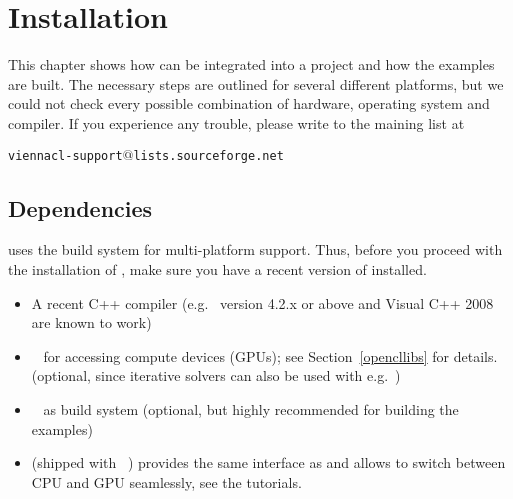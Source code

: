 \chapter{Installation}

This chapter shows how {\ViennaCL} can be integrated into a project and how the
examples are built. The necessary steps are outlined for several different
platforms, but we could not check every possible combination of hardware,
operating system and compiler. If you experience any trouble, please write to
the maining list at \\
\begin{center}
\texttt{viennacl-support$@$lists.sourceforge.net} 
\end{center}


\section{Dependencies}
\label{dependencies}
{\ViennaCL} uses the {\CMake} build system for multi-platform support.
Thus, before you proceed with the installation of {\ViennaCL}, make sure you
have a recent version of {\CMake} installed.

\begin{itemize}
 \item A recent C++ compiler (e.g.~{\GCC} version 4.2.x or above and Visual C++
2008 are known to work)
 \item {\OpenCL}~\cite{khronoscl,nvidiacl} for accessing compute devices (GPUs);
see Section~\ref{opencllibs} for details.
(optional, since iterative solvers can also be used with e.g.~{\ublas})
 \item {\CMake}~\cite{cmake} as build system (optional, but highly recommended
for building the examples)
 \item {\ublas} (shipped with {\Boost}~\cite{boost}) provides the same interface as {\ViennaCL} and allows to switch between CPU and GPU seamlessly, see the tutorials.
\end{itemize}


